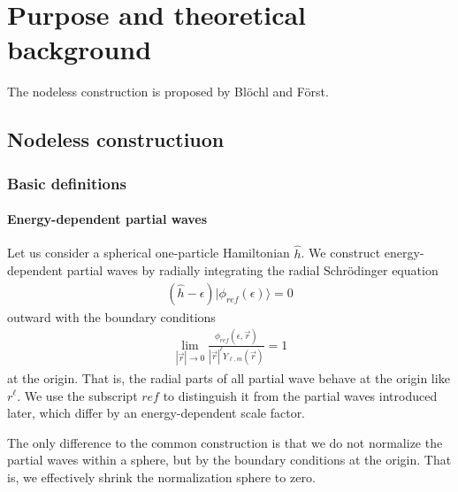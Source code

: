 \documentclass[11pt,a4paper]{report}
\begin{document}
\chapter{Purpose and theoretical background}
The nodeless construction is proposed by Bl\"ochl and
F\"orst\cite{bloechl12_arxiv1210_5937}.

\section{Nodeless constructiuon}
\subsection{Basic definitions}
\subsubsection{Energy-dependent partial waves}
Let us consider a spherical one-particle Hamiltonian $\hat{h}$. We
construct energy-dependent partial waves by radially integrating the
radial Schr\"odinger equation 
\begin{eqnarray}
(\hat{h}-\epsilon)|\phi_{ref}(\epsilon)\rangle=0
\end{eqnarray}
outward with the boundary
conditions 
\begin{eqnarray}
\lim_{|\vec{r}|\rightarrow0}\frac{\phi_{ref}(\epsilon,\vec{r})}
{|\vec{r}|^\ell Y_{\ell,m}(\vec{r})}=1
\end{eqnarray}
at the origin. That is, the radial parts of all partial wave behave at
the origin like $r^\ell$. We use the subscript $ref$ to distinguish it
from the partial waves introduced later, which differ by an
energy-dependent scale factor.

The only difference to the common construction is that we do not
normalize the partial waves within a sphere, but by the boundary
conditions at the origin. That is, we effectively shrink the
normalization sphere to zero.
\end{document}
